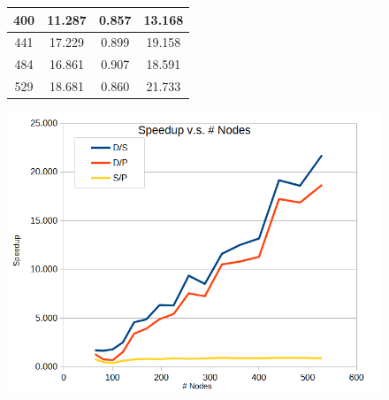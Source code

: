 \documentclass[letterpaper, 10 pt, conference]{ieeeconf}  %
\begin{document}
\begin{figure}
\begin{minipage}[b]{.45\linewidth}
\begin{center}
\begin{tabular}{|c|c|c|c|}
                                400               & 11.287                  & 0.857                    & 13.168                    \\ \hline
                                441               & 17.229                  & 0.899                    & 19.158                    \\ \hline
                                484               & 16.861                  & 0.907                    & 18.591                    \\ \hline
                                529               & 18.681                  & 0.860                    & 21.733                    \\ \hline
                        \end{tabular}
                \end{center}
                \label{fig:speedups}
        \end{minipage}\hfill
        \begin{minipage}[b]{.45\linewidth}
                \centering
                \includegraphics[width=1.0\linewidth]{speedups.png}
                 \label{fig:speedupsgraph}
        \end{minipage}
\end{figure}

\twocolumn
\end{document}
